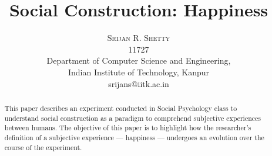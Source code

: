 \documentclass[twoside]{article}
\title{\vspace{-15mm}\fontsize{24pt}{10pt}\selectfont\textbf{Social Construction: Happiness}} %
\author{
\large
\textsc{Srijan R. Shetty} \\ %
\normalsize{11727}\\[2mm] %
\normalsize{Department of Computer Science and Engineering,} \\ %
\normalsize Indian Institute of Technology, Kanpur \\ %
\normalsize {srijans@iitk.ac.in} %
\vspace{-5mm}
}
\date{}
\begin{document}
\maketitle %

\thispagestyle{fancy} %


\begin{abstract}

\noindent 
This paper describes an experiment conducted in Social Psychology class to understand
social construction as a paradigm to comprehend subjective experiences between humans.
The objective of this paper is to highlight how the researcher's definition of a subjective
experience --- happiness --- undergoes an evolution over the course of the experiment.

\end{abstract}

\end{document}
